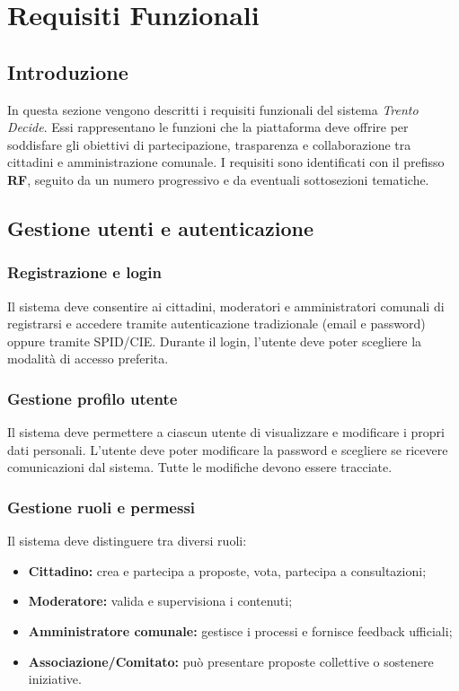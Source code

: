 \chapter{Requisiti Funzionali}

\renewcommand{\thesubsection}{\textbf{RF\arabic{section}.\arabic{subsection}}}

\setlength{\parskip}{0.4em}
\setlength{\parindent}{0pt}

\section{Introduzione}
In questa sezione vengono descritti i requisiti funzionali del sistema \textit{Trento Decide}.  
Essi rappresentano le funzioni che la piattaforma deve offrire per soddisfare gli obiettivi di partecipazione, trasparenza e collaborazione tra cittadini e amministrazione comunale.  
I requisiti sono identificati con il prefisso \textbf{RF}, seguito da un numero progressivo e da eventuali sottosezioni tematiche.

\section{Gestione utenti e autenticazione}

\subsection{Registrazione e login}
Il sistema deve consentire ai cittadini, moderatori e amministratori comunali di registrarsi e accedere tramite autenticazione tradizionale (email e password) oppure tramite SPID/CIE.  
Durante il login, l’utente deve poter scegliere la modalità di accesso preferita.

\subsection{Gestione profilo utente}
Il sistema deve permettere a ciascun utente di visualizzare e modificare i propri dati personali.  
L’utente deve poter modificare la password e scegliere se ricevere comunicazioni dal sistema.  
Tutte le modifiche devono essere tracciate.

\subsection{Gestione ruoli e permessi}
Il sistema deve distinguere tra diversi ruoli:
\begin{itemize}
    \item \textbf{Cittadino:} crea e partecipa a proposte, vota, partecipa a consultazioni;
    \item \textbf{Moderatore:} valida e supervisiona i contenuti;
    \item \textbf{Amministratore comunale:} gestisce i processi e fornisce feedback ufficiali;
    \item \textbf{Associazione/Comitato:} può presentare proposte collettive o sostenere iniziative.
\end{itemize}

